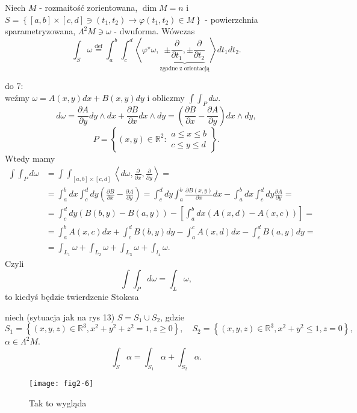 \documentclass[../main.tex]{subfiles}
\begin{document}
\pagebreak
\begin{definicja}
    Niech $M$ - rozmaitość zorientowana, $\dim M = n$ i \\
    $S = \left\{ [a,b]\times[c,d]\ni (t_1,t_2) \to \varphi(t_1,t_2)\in M \right\}$ - powierzchnia sparametryzowana, $\Lambda^2M\ni\omega$ - dwuforma. Wówczas
    \[
        \int_S \omega \overset{\text{def}}{=} \int_a^b\int_c^d \left<\varphi^\star\omega, \underbrace{\pm \frac{\partial }{\partial t_1} , \pm \frac{\partial }{\partial t_2}}_\text{zgodne z orientacją}\right>dt_1dt_2
    .\]
\end{definicja}
\begin{przyklad}
    do 7:\\
    weźmy $\omega = A(x,y)dx + B(x,y)dy$ i obliczmy $\int\int_P d\omega$.
     \[
         d\omega = \frac{\partial A}{\partial y} dy\land dx + \frac{\partial B}{\partial x} dx\land dy = \left(\frac{\partial B}{\partial x} - \frac{\partial A}{\partial y} \right)dx\land dy
    ,\]
\[
    P = \left\{ (x,y)\in \mathbb{R}^2: \begin{matrix}a\le x\le b\\ c\le y \le d \end{matrix} \right\}
.\]
Wtedy mamy
\begin{align*}
    \int\int_P d\omega &= \int\int_{[a,b]\times[c,d]} \left<d\omega, \frac{\partial }{\partial x} , \frac{\partial }{\partial y}  \right> = \\
    &= \int_a^b dx \int_c^d dy\left(\frac{\partial B}{\partial x} - \frac{\partial A}{\partial y} \right) = \int_c^d dy\int_a^b \frac{\partial B(x,y)}{\partial x} dx - \int_a^bdx\int_c^ddy \frac{\partial A}{\partial y} = \\
    &= \int_c^d dy(B(b,y) - B(a,y)) - \left[ \int_a^bdx \left( A(x,d) - A(x,c) \right)  \right] = \\
    &= \int_a^bA(x,c)dx + \int_c^dB(b,y)dy - \int_a^cA(x,d)dx - \int_c^dB(a,y)dy =\\
    &= \int_{L_1}\omega + \int_{L_2}\omega + \int_{L_3}\omega + \int_{l_4}\omega
.\end{align*}
Czyli \[
\int\int_Pd\omega = \int_L \omega
,\]
to kiedyś będzie twierdzenie Stokesa
\end{przyklad}
\begin{przyklad}
    niech (sytuacja jak na rys 13) $S = S_1\cup S_2$, gdzie
    \[
        S_1 = \left\{ (x,y,z)\in \mathbb{R}^3, x^2 + y^2 + z^2 = 1, z\ge 0 \right\},\quad S_2 = \left\{ (x,y,z)\in \mathbb{R}^3, x^2+y^2 \le 1, z = 0 \right\}
    ,\]
$\alpha\in \Lambda^2M$.
\[
\int_S \alpha = \int_{S_1}\alpha + \int_{S_2}\alpha
.\]
    \begin{figure}[h]
        \centering
        \texttt{[image: fig2-6]}
        \caption{Tak to wygląda}
        \label{fig:fig2-6}
    \end{figure}
\end{przyklad}
\end{document}
